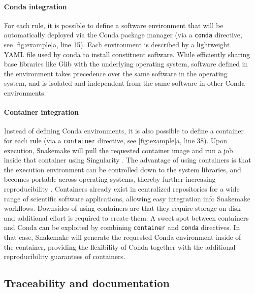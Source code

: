 \documentclass[parskip=half]{scrartcl}
\begin{document}
\paragraph{Conda integration}

For each rule, it is possible to define a software environment that will be automatically deployed via the Conda package manager (via a \lstinline!conda! directive, see \autoref{fig:example}a, line 15). Each environment is described by a lightweight YAML file used by conda to install constituent software.
While efficiently sharing base libraries like Glib with the underlying operating system, software defined in the environment takes precedence over the same software in the operating system, and is isolated and independent from the same software in other Conda environments. 

\paragraph{Container integration}

Instead of defining Conda environments, it is also possible to define a container for each rule (via a \lstinline!container! directive, see \autoref{fig:example}a, line 38).
Upon execution, Snakemake will pull the requested container image and run a job inside that container using Singularity \parencite{kurtzer_singularity_2017}.
The advantage of using containers is that the execution environment can be controlled down to the system libraries, and becomes portable across operating systems, thereby further increasing reproducibility \parencite{gruning_practical_2018}. Containers already exist in centralized repositories for a wide range of scientific software applications, allowing easy integration info Snakemake workflows. Downsides of using containers are that they require storage on disk and additional effort is required to create them. A sweet spot between containers and Conda can be exploited by combining \lstinline!container! and \lstinline!conda! directives.
In that case, Snakemake will generate the requested Conda environment inside of the container, providing the flexibility of Conda together with the additional reproducibility guarantees of containers.

\subsection{Traceability and documentation}
\end{document}
